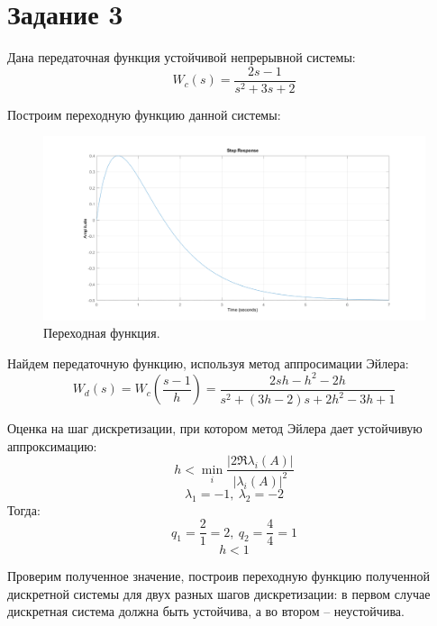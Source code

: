 \documentclass[12pt]{article}
\begin{document}
\section*{Задание 3}
Дана передаточная функция устойчивой непрерывной системы:
\[
    W_c(s) = \frac{2s - 1}{s^2 + 3s + 2}
\]

Построим переходную функцию данной системы:
\begin{figure}[H]
    \centering
    \includegraphics[width=\textwidth]{3_h_t.png}
    \caption{Переходная функция.}
    \label{fig:3_h_t.png}
\end{figure}

Найдем передаточную функцию, используя метод аппросимации Эйлера:
\[
    W_d(s) = W_c(\frac{s - 1}{h}) = \frac{2sh - h^2 - 2h}{s^2 + (3h - 2)s + 2h^2 - 3h + 1}
\]

Оценка на шаг дискретизации, при котором метод Эйлера дает устойчивую аппроксимацию:
\[
    h < \min_i \frac{|2 \Re \lambda_i(A)|}{|\lambda_i(A)|^2}
\]
\[
    \lambda_1 = -1, \ \lambda_2 = -2
\]
Тогда: 
\[
    q_1 = \frac{2}{1} = 2, \ q_2 = \frac{4}{4} = 1
\]
\[
    h < 1
\]

Проверим полученное значение, построив переходную функцию полученной дискретной системы для двух разных шагов дискретизации: в первом случае дискретная система должна быть устойчива, а во втором – неустойчива.
\end{document}
